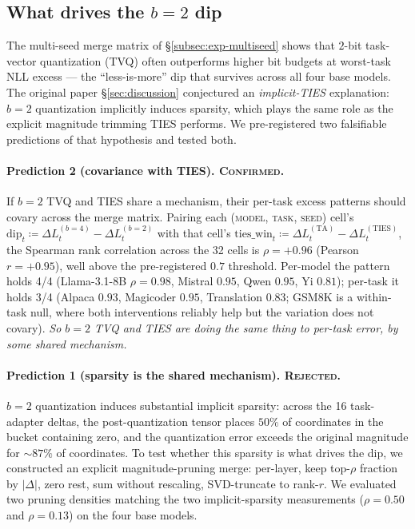 
\subsection{What drives the $b=2$ dip}
\label{subsec:exp-b2-mechanism}

The multi-seed merge matrix of \S\ref{subsec:exp-multiseed} shows
that $2$-bit task-vector quantization (TVQ) often outperforms higher
bit budgets at worst-task NLL excess --- the ``less-is-more'' dip
that survives across all four base models. The original paper
\S\ref{sec:discussion} conjectured an \emph{implicit-TIES}
explanation: $b=2$ quantization implicitly induces sparsity, which
plays the same role as the explicit magnitude trimming TIES
performs. We pre-registered two falsifiable predictions of that
hypothesis and tested both.

\paragraph{Prediction 2 (covariance with TIES). \textsc{Confirmed.}}
If $b=2$ TVQ and TIES share a mechanism, their per-task excess
patterns should covary across the merge matrix. Pairing each
\textsc{(model, task, seed)} cell's
$\text{dip}_t \coloneqq \Delta L_t^{(b=4)} - \Delta L_t^{(b=2)}$
with that cell's
$\text{ties\_win}_t \coloneqq \Delta L_t^{(\mathrm{TA})}
- \Delta L_t^{(\mathrm{TIES})}$,
the Spearman rank correlation across the 32 cells is
$\rho = +0.96$ (Pearson $r = +0.95$), well above the pre-registered
$0.7$ threshold. Per-model the pattern holds 4/4 (Llama-3.1-8B
$\rho=0.98$, Mistral $0.95$, Qwen $0.95$, Yi $0.81$); per-task it
holds 3/4 (Alpaca $0.93$, Magicoder $0.95$, Translation $0.83$;
GSM8K is a within-task null, where both interventions reliably
help but the variation does not covary). \emph{So $b=2$ TVQ and
TIES are doing the same thing to per-task error, by some shared
mechanism.}

\paragraph{Prediction 1 (sparsity is the shared mechanism). \textsc{Rejected.}}
$b=2$ quantization induces substantial implicit sparsity: across
the 16 task-adapter deltas, the post-quantization tensor places
$50\%$ of coordinates in the bucket containing zero, and the
quantization error exceeds the original magnitude for $\sim 87\%$
of coordinates. To test whether this sparsity is what drives the
dip, we constructed an explicit magnitude-pruning merge:
per-layer, keep top-$\rho$ fraction by $\lvert\Delta\rvert$, zero
rest, sum without rescaling, SVD-truncate to rank-$r$. We evaluated
two pruning densities matching the two implicit-sparsity measurements
($\rho = 0.50$ and $\rho = 0.13$) on the four base models.

